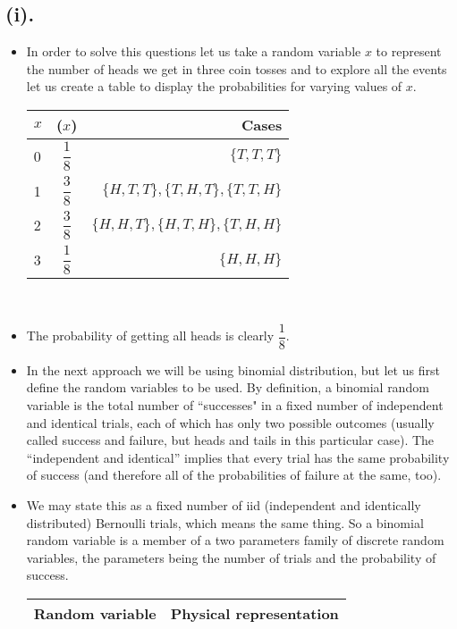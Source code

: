 \documentclass{article}
\begin{document}
	\subsection*{(i).}
	\begin{itemize}
		\item In order to solve this questions let us take a random variable $x$ to represent the number of heads we get in three coin tosses and to explore all the events let us create a table to display the probabilities for varying values of $x$.\\[6pt]
		\begin{tabular}{|l|c|r|}
			\hline
			$x$ & \Pr($x$) & Cases\\
			\hline
			0 & $\dfrac{1}{8}$ & $\{T,T,T\}$\\[8pt]
			\hline
			1 & $\dfrac{3}{8}$ & $\{H,T,T\}, \{T,H,T\}, \{T,T,H\}$\\[8pt]
			\hline
			2 & $\dfrac{3}{8}$ & $\{H,H,T\}, \{H,T,H\}, \{T,H,H\}$\\[8pt]
			\hline
			3 & $\dfrac{1}{8}$ & $\{H,H,H\}$ \\[8pt]
			\hline
		\end{tabular}\\[6pt]
		\item The probability of getting all heads is clearly $\dfrac{1}{8}$.\\[4pt]
		\item In the next approach we will be using binomial distribution, but let us first define the random variables to be used. By definition, a binomial random variable is the total number of “successes" in a fixed number of independent and identical trials, each of which has only two possible outcomes (usually called success and failure, but heads and tails in this particular case). The “independent and identical” implies that every trial has the same probability of success (and therefore all of the probabilities of failure at the same, too).\\[6pt]
		\item We may state this as a fixed number of iid (independent and identically distributed) Bernoulli trials, which means the same thing. So a binomial random variable is a member of a two parameters family of discrete random variables, the parameters being the number of trials and the probability of success.\\[8pt]
		\begin{tabular}{|l|r|}
			\hline
			Random variable & Physical representation\\
			\hline

\end{tabular}
\end{itemize}
\end{document}

